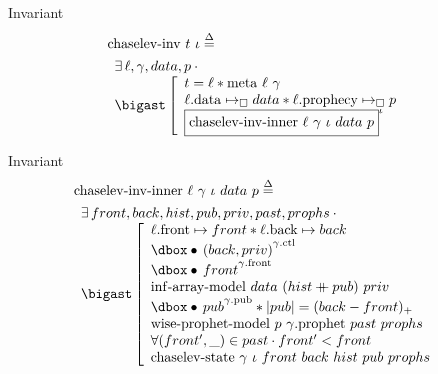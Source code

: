 \begin{frame}{Invariant}
\begin{align*}
		&\mathrm{chaselev \mathhyphen inv}\ t\ \iota
		\eqdef
	\\
		&\begin{array}{l}
				\exists \ell, \gamma, data, p \cdot \phantom{}
			\\
				\iBigsep\left[\begin{array}{l}
						t = \ell \iSep
						\mathrm{meta}\ \ell\ \gamma
					\\
						\ell\mathrm{.data} \mapsto_\square data \iSep
						\ell\mathrm{.prophecy} \mapsto_\square p
					\\
						\iInv{\iota}{\mathrm{chaselev \mathhyphen inv \mathhyphen inner}\ \ell\ \gamma\ \iota\ data\ p}
				\end{array}\right.
		\end{array}
\end{align*}
\end{frame}


\begin{frame}{Invariant}
\begin{align*}
		&\mathrm{chaselev \mathhyphen inv \mathhyphen inner}\ \ell\ \gamma\ \iota\ data\ p
		\eqdef
	\\
		&\begin{array}{l}
				\exists front, back, hist, pub, priv, past, prophs \cdot \phantom{}
			\\
				\iBigsep\left[\begin{array}{l}
						\ell\mathrm{.front} \mapsto front \iSep
						\ell\mathrm{.back} \mapsto back
					\\
						\iGhost{\gamma\mathrm{.ctl}}{\iAuth{(back, priv)}}
					\\
						\iGhost{\gamma\mathrm{.front}}{\iAuth{front}}
					\\
						\mathrm{inf \mathhyphen array \mathhyphen model}\ data\ (hist \mdoubleplus pub)\ priv
					\\
						\iGhost{\gamma\mathrm{.pub}}{\iAuth{pub}} \iSep
						| pub | = (back - front)_+
					\\
						\mathrm{wise \mathhyphen prophet \mathhyphen model}\ p\ \gamma\mathrm{.prophet}\ past\ prophs
					\\
						\forall (front', \_) \in past \cdot front' < front
					\\
						\mathrm{chaselev \mathhyphen state}\ \gamma\ \iota\ front\ back\ hist\ pub\ prophs
				\end{array}\right.
		\end{array}
\end{align*}
\end{frame}

